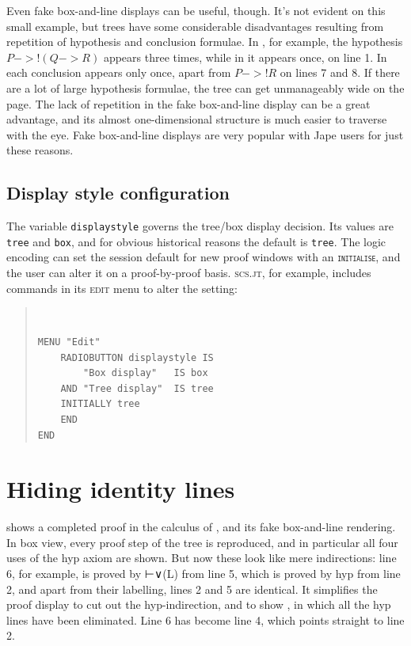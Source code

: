 \documentclass[11pt]{article}
\newenvironment{japeish}{\begin{quote}\tt\small}{\end{quote}}
\newcommand{\textj}[1]{{\tt\small{#1}}}
\begin{document}
Even fake box-and-line displays can be useful, though. It's not evident on this small example, but trees have some considerable disadvantages resulting from repetition of hypothesis and conclusion formulae. In , for example, the hypothesis $P->!(Q->R)$ appears three times, while in  it appears once, on line 1. In  each conclusion appears only once, apart from $P->!R$ on lines 7 and 8. If there are a lot of large hypothesis formulae, the tree can get unmanageably wide on the page. The lack of repetition in the fake box-and-line display can be a great advantage, and its almost one-dimensional structure is much easier to traverse with the eye. Fake box-and-line displays are very popular with Jape users for just these reasons.

\subsection{Display style configuration}

The variable \textj{displaystyle} governs the tree/box display decision. Its values are \textj{tree} and \textj{box}, and for obvious historical reasons the default is \textj{tree}. The logic encoding can set the session default for new proof windows with an \textj{\textsc{initialise}}, and the user can alter it on a proof-by-proof basis. \textsc{scs.jt}, for example, includes commands in its \textsc{edit} menu to alter the setting:
\begin{japeish}
\begin{verbatim}
MENU "Edit"
    RADIOBUTTON displaystyle IS
        "Box display"   IS box
    AND "Tree display"  IS tree
    INITIALLY tree
    END
END
\end{verbatim}
\end{japeish}


\section{Hiding identity lines}

 shows a completed proof in the calculus of , and  its fake box-and-line rendering. In box view, every proof step of the tree is reproduced, and in particular all four uses of the hyp axiom are shown. But now these look like mere indirections: line 6, for example, is proved by ⊢∨(L) from line 5, which is proved by hyp from line 2, and apart from their labelling, lines 2 and 5 are identical. It simplifies the proof display to cut out the hyp-indirection, and to show , in which all the hyp lines have been eliminated. Line 6 has become line 4, which points straight to line 2.
\end{document}
